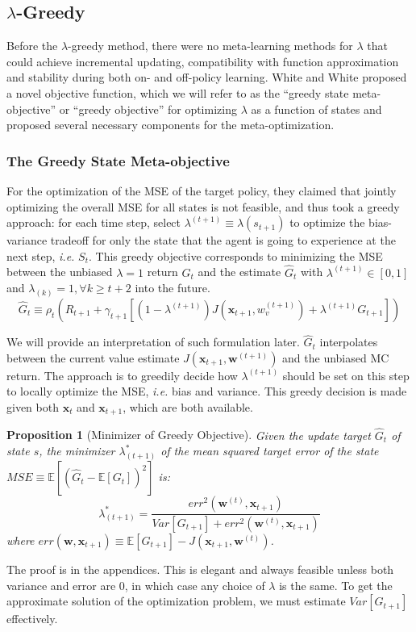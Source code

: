 \documentclass{article}
\newcommand\ie{\textit{i.e.}}
\newcommand\doubleE{\mathbb{E}}
\newtheorem{proposition}{Proposition}[section]
\begin{document}
\subsection{$\lambda$-Greedy}\label{sec:whites}
Before the $\lambda$-greedy method, there were no meta-learning methods for $\lambda$ that could achieve incremental updating, compatibility with function approximation and stability during both on- and off-policy learning. White and White \cite{white2016greedy} proposed a novel objective function, which we will refer to as the ``greedy state meta-objective'' or ``greedy objective'' for optimizing $\lambda$ as a function of states and proposed several necessary components for the meta-optimization.

\subsubsection{The Greedy State Meta-objective}
For the optimization of the MSE of the target policy, they claimed that jointly optimizing the overall MSE for all states is not feasible, and thus took a greedy approach: for each time step, select $\lambda^{(t+1)} \equiv \lambda(s_{t+1})$ to optimize the bias-variance tradeoff for only the state that the agent is going to experience at the next step, \ie{} $S_t$. This greedy objective corresponds to minimizing the MSE between the unbiased $\lambda = 1$ return $G_t$ and the estimate $\hat{G}_t$ with $\lambda^{(t+1)} \in [0, 1]$ and $\lambda_{(k)} = 1, \forall k \geq t + 2$ into the future.
$$\hat{G}_t \equiv \rho_t(R_{t+1} + \gamma_{t+1} [(1 - \lambda^{(t+1)})J(\bm{x}_{t+1}, w_v^{(t+1)}) + \lambda^{(t+1)} G_{t+1}])$$
\par
We will provide an interpretation of such formulation later. $\hat{G}_t$ interpolates between the current value estimate $J(\bm{x}_{t+1}, \bm{w}^{(t+1)})$ and the unbiased MC return. The approach is to greedily decide how $\lambda^{(t+1)}$ should be set on this step to locally optimize the MSE, \ie{} bias and variance. This greedy decision is made given both $\bm{x}_t$ and $\bm{x}_{t+1}$, which are both available.
\begin{proposition}[Minimizer of Greedy Objective]\label{prop:greedy_minimizer}
Given the update target $\hat{G}_t$ of state $s$, the minimizer $\lambda_{(t+1)}^*$ of the mean squared target error of the state
$MSE \equiv \doubleE[{(\hat{G}_t - \doubleE[G_t])}^2]$ is:
\begin{equation}\label{eq:white_argmin}
\lambda_{(t+1)}^* = \frac{{err}^2(\bm{w}^{(t)}, \bm{x}_{t+1})}{Var[G_{t+1}] + {err}^2(\bm{w}^{(t)}, \bm{x}_{t+1})}
\end{equation}
where $err(\bm{w}, \bm{x}_{t+1}) \equiv \doubleE[G_{t+1}] - J(\bm{x}_{t+1}, \bm{w}^{(t)})$.
\end{proposition}
The proof is in the appendices. This is elegant and always feasible unless both variance and error are $0$, in which case any choice of $\lambda$ is the same. To get the approximate solution of the optimization problem, we must estimate $Var[G_{t+1}]$ effectively.
\end{document}
